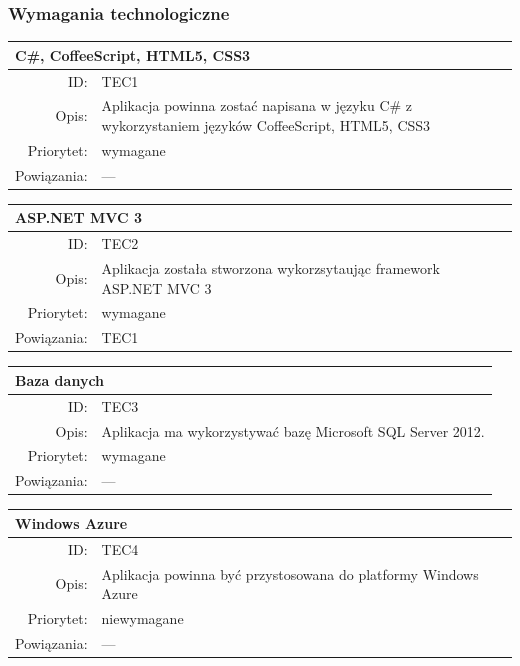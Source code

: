 \subsubsection{Wymagania technologiczne}
      \begin{center}
      \begin{tabular}{rp{10cm}}
        \multicolumn{2}{l}{\textbf{C\#, CoffeeScript, HTML5, CSS3}} \\
        \hline
        ID: & TEC1 \\
        Opis: & Aplikacja powinna zostać napisana w języku C\# z wykorzystaniem języków CoffeeScript, HTML5, CSS3 \\
        Priorytet: & wymagane \\
        Powiązania: & --- \\
      \end{tabular}
      \end{center}

      \begin{center}
      \begin{tabular}{rp{10cm}}
        \multicolumn{2}{l}{\textbf{ASP.NET MVC 3}} \\
        \hline
        ID: & TEC2 \\
        Opis: & Aplikacja została stworzona wykorzsytaując framework ASP.NET MVC 3 \\
        Priorytet: & wymagane \\
        Powiązania: & TEC1 \\
      \end{tabular}
      \end{center}



      \begin{center}
      \begin{tabular}{rp{10cm}}
        \multicolumn{2}{l}{\textbf{Baza danych}} \\
        \hline
        ID: & TEC3 \\
        Opis: & Aplikacja ma wykorzystywać bazę Microsoft SQL Server 2012. \\
        Priorytet: & wymagane \\
        Powiązania: & --- \\
      \end{tabular}
      \end{center}



      \begin{center}
      \begin{tabular}{rp{10cm}}
        \multicolumn{2}{l}{\textbf{Windows Azure}} \\
        \hline
        ID: & TEC4 \\
        Opis: & Aplikacja powinna być przystosowana do platformy Windows Azure \\
        Priorytet: & niewymagane \\
        Powiązania: & --- \\
      \end{tabular}
      \end{center}

